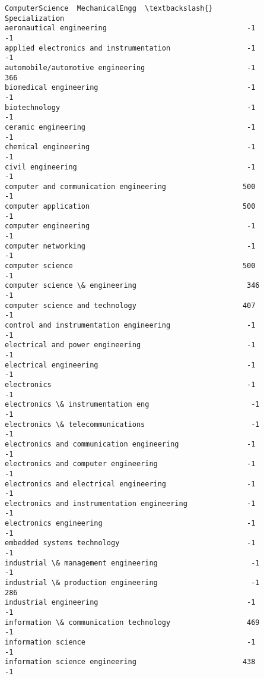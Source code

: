 \documentclass[11pt]{article}
\begin{document}
\begin{tcolorbox}[breakable, size=fbox, boxrule=.5pt, pad at break*=1mm, opacityfill=0]
\begin{Verbatim}[commandchars=\\\{\}]
                                            ComputerScience  MechanicalEngg  \textbackslash{}
Specialization
aeronautical engineering                                 -1              -1
applied electronics and instrumentation                  -1              -1
automobile/automotive engineering                        -1             366
biomedical engineering                                   -1              -1
biotechnology                                            -1              -1
ceramic engineering                                      -1              -1
chemical engineering                                     -1              -1
civil engineering                                        -1              -1
computer and communication engineering                  500              -1
computer application                                    500              -1
computer engineering                                     -1              -1
computer networking                                      -1              -1
computer science                                        500              -1
computer science \& engineering                          346              -1
computer science and technology                         407              -1
control and instrumentation engineering                  -1              -1
electrical and power engineering                         -1              -1
electrical engineering                                   -1              -1
electronics                                              -1              -1
electronics \& instrumentation eng                        -1              -1
electronics \& telecommunications                         -1              -1
electronics and communication engineering                -1              -1
electronics and computer engineering                     -1              -1
electronics and electrical engineering                   -1              -1
electronics and instrumentation engineering              -1              -1
electronics engineering                                  -1              -1
embedded systems technology                              -1              -1
industrial \& management engineering                      -1              -1
industrial \& production engineering                      -1             286
industrial engineering                                   -1              -1
information \& communication technology                  469              -1
information science                                      -1              -1
information science engineering                         438              -1

\end{Verbatim}
\end{tcolorbox}
\end{document}
